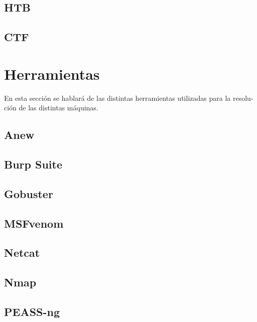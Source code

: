 \documentclass[a4paper, 12pt]{article} %
\begin{document}
\begin{otherlanguage}{spanish}
    \subsection{\acrlong{HTB}}
    

    \subsection{\acrlong{CTF}}
    

    \newpage
    \section{Herramientas}
    En esta sección se hablará de las distintas herramientas utilizadas para la resolución de las distintas máquinas.

    \subsection{Anew}
    

    \subsection{Burp Suite}
    

    \subsection{Gobuster}
    

    \subsection{MSFvenom}
    

    \subsection{Netcat}
    

    \subsection{Nmap}
    

    \subsection{PEASS-ng}
    


\end{otherlanguage}
\end{document}

